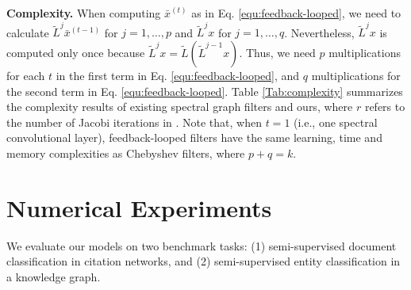 \documentclass{article}
\begin{document}
\begin{table}[h!]
\centering\vspace{-0cm}
 \caption{Learning, time and space complexities of spectral graph filters. \label{Tab:complexity}}\vspace{-0.3cm}
\end{table}
\noindent\textbf{Complexity. } When computing $\bar{x}^{(t)}$ as in Eq. \ref{equ:feedback-looped}, we need to calculate $\tilde{L}^j \bar{x}^{(t-1)}$ for $j=1, \dots, p$ and $\tilde{L}^j x$ for $j=1, \dots, q$. Nevertheless, $\tilde{L}^j x$ is computed only once because $\tilde{L}^j x = \tilde{L}(\tilde{L}^{j-1} x)$. Thus, we need $p$ multiplications for each $t$ in the first term in Eq. \ref{equ:feedback-looped}, and $q$ multiplications for the second term in Eq. \ref{equ:feedback-looped}. Table \ref{Tab:complexity} summarizes the complexity results of existing spectral graph filters and ours, where $r$ refers to the number of Jacobi iterations in \cite{levie2017cayleynets}. Note that, when $t=1$ (i.e., one spectral convolutional layer), feedback-looped filters have the same learning, time and memory complexities as Chebyshev filters, where $p+q=k$.
 
\section{Numerical Experiments}
\label{sec:experiments}
We evaluate our models on two benchmark tasks: (1) semi-supervised document classification in citation networks, and (2) semi-supervised entity classification in a knowledge graph.   
\end{document}
